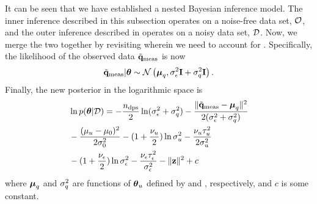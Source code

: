 It can be seen that we have established a nested Bayesian inference model. The inner inference described in this subsection operates on a noise-free data set, $\mathcal{O}$, and the outer inference described in  operates on a noisy data set, $\mathcal{D}$. Now, we merge the two together by revisiting  wherein we need to account for . Specifically, the likelihood of the observed data $\tilde{\mathbf{q}}_{\text{meas}}$ is now
\begin{equation} \elabel{noise-approximation-model}
  \mvT_\meas | \vparam \sim \gaussian{\vmean_\T}{\sigma_\noise^2 \mI + \sigma_\T^2 \mI}.
\end{equation}
Finally, the new posterior in the logarithmic space is
\begin{align}
  & \ln \f{\vparam | \Data} = -\frac{\ndcs}{2} \ln(\sigma^2_\noise + \sigma^2_\T) - \frac{\norm{\mvT_\meas - \vmean_\T}^2}{2(\sigma^2_\noise + \sigma^2_\T)} \nonumber \\
  & {} - \frac{(\mu_\u - \mu_0)^2}{2 \sigma^2_0} - (1 + \frac{\nu_\u}{2}) \ln \sigma^2_\u - \frac{\nu_\u \tau_\u^2}{2 \sigma^2_\u} \nonumber \\
  & {} - (1 + \frac{\nu_\noise}{2}) \ln \sigma^2_\noise - \frac{\nu_\noise \tau_\noise^2}{\sigma^2_\noise} - \norm{\vz}^2 + c \elabel{log-posterior}
\end{align}
where ${\boldsymbol\mu}_q$ and $\sigma^2_q$ are functions of ${\boldsymbol\theta}_u$ defined by  and , respectively, and $c$ is some constant.
